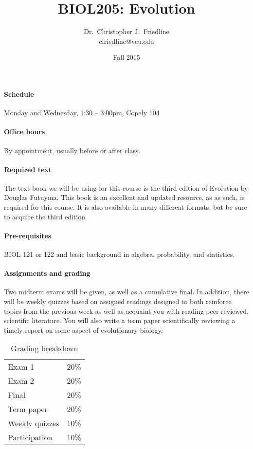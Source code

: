 \documentclass{article}
\title{BIOL205: Evolution}
\author{Dr.\ Christopher J.\ Friedline \\ cfriedline@vcu.edu}
\date{Fall 2015}
\begin{document}
\maketitle
\linespread{1.3}

\paragraph{Schedule}
Monday and Wednesday, 1:30 -- 3:00pm, Copely 104

\paragraph{Office hours}
By appointment, usually before or after class.

\paragraph{Required text}
The text book we will be using for this course is
the third edition of Evolution by Douglas Futuyma. This book is an excellent
and updated resource, as as such, is required for this course. It is also
available in many different formats, but be sure to acquire the third edition.

\paragraph{Pre-requisites}
BIOL 121 or 122 and basic background in algebra, probability, and statistics.

\paragraph{Assignments and grading}
Two midterm exams will be given, as well
as a cumulative final.  In addition, there will be weekly quizzes based on
assigned readings designed to both reinforce topics from the previous week as
well as acquaint you with reading peer-reviewed, scientific literature.  You
will also write a term paper scientifically reviewing a timely report on some
aspect of evolutionary biology.

\begin{table}[h]
\centering
\caption*{Grading breakdown}

\begin{tabular}{l|r}
Exam 1          &   20\% \\
Exam 2          &   20\% \\
Final           &   20\% \\
Term paper      &   20\% \\
Weekly quizzes  &	10\% \\
Participation   &   10\% \\

\end{tabular}

\end{table}
\end{document}

